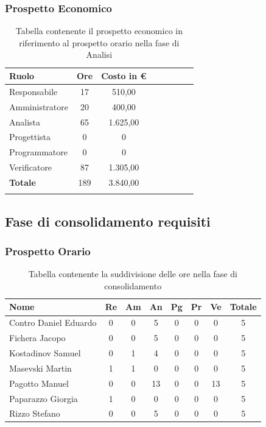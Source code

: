 \documentclass[../piano_di_progetto.tex]{subfiles}
\begin{document}
\newpage

\subsubsection{Prospetto Economico}


\begin{longtable}{|l|c|c|c|c|c|c|c|}
	\hline
	\rowcolor{lightgray}
	\textbf{Ruolo} & \textbf{Ore} & \textbf{Costo in €}\\
	\endhead
	\hline
	Responsabile & 17 & 510,00 \\
	\hline
	Amministratore & 20 & 400,00 \\
	\hline
	Analista & 65 & 1.625,00 \\
	\hline
	Progettista & 0 & 0 \\
	\hline
	Programmatore & 0 & 0 \\
	\hline
	Verificatore & 87 & 1.305,00 \\
	\hline
	\textbf{Totale} & 189 & 3.840,00 \\
	\hline
	\rowcolor{white}
	\caption{Tabella contenente il prospetto economico in riferimento al prospetto orario nella fase di Analisi} 
\end{longtable}


\subsection{ Fase di consolidamento requisiti}%
\label{sub:fase_cons}
\subsubsection{Prospetto Orario}

\begin{table}[!ht]

	\centering
	\begin{tabular}{|l|c|c|c|c|c|c|c|}
	\hline
	\rowcolor{lightgray}
	\textbf{Nome} & \textbf{Re} & \textbf{Am} & \textbf{An} & \textbf{Pg}  & \textbf{Pr}   & \textbf{Ve} & \textbf{Totale} \\
	\hline
		Contro Daniel Eduardo & 0 & 0 & 5 & 0 & 0 & 0  & 5 \\
	\hline
		Fichera Jacopo & 0 & 0 & 5 & 0 & 0 & 0 & 5 \\
	\hline
		Kostadinov Samuel & 0 & 1 & 4 & 0 & 0 & 0 & 5 \\			
	\hline
		Masevski Martin & 1 & 1 & 0 & 0 & 0 & 0 & 5 \\
	\hline
		Pagotto Manuel & 0 & 0 & 13 & 0 & 0 & 13 & 5 \\			
	\hline
		Paparazzo Giorgia & 1 & 0 & 0 & 0 & 0 & 0 & 5 \\
	\hline
		Rizzo Stefano & 0 & 0 & 5 & 0 & 0 & 0 & 5 \\
	\hline	
	\end{tabular}
	\caption{Tabella contenente la suddivisione delle ore nella fase di consolidamento}
\end{table}
\end{document}
